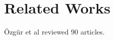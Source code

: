 \section{Related Works}
\label{section-related-works}


Özgür et al \cite{ozgur2021review} reviewed 90 articles.



